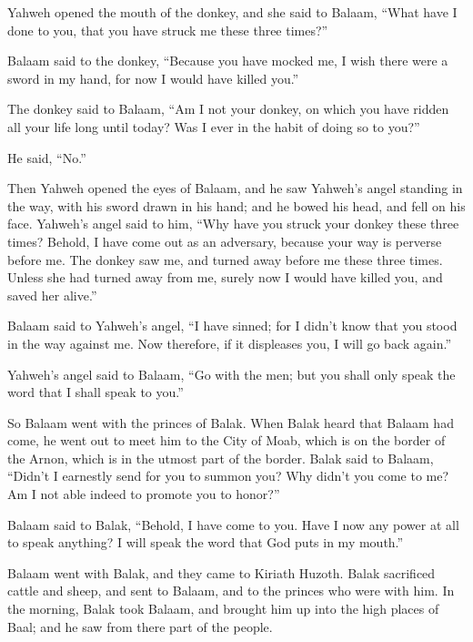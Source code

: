  Yahweh opened the mouth of the donkey, and she said to
Balaam, ``What have I done to you, that you have struck me these three
times?''

 Balaam said to the donkey, ``Because you have mocked me,
I wish there were a sword in my hand, for now I would have killed you.''

 The donkey said to Balaam, ``Am I not your donkey, on
which you have ridden all your life long until today? Was I ever in the
habit of doing so to you?''

He said, ``No.''

 Then Yahweh opened the eyes of Balaam, and he saw
Yahweh's angel standing in the way, with his sword drawn in his hand;
and he bowed his head, and fell on his face.  Yahweh's
angel said to him, ``Why have you struck your donkey these three times?
Behold, I have come out as an adversary, because your way is perverse
before me.  The donkey saw me, and turned away before me
these three times. Unless she had turned away from me, surely now I
would have killed you, and saved her alive.''

 Balaam said to Yahweh's angel, ``I have sinned; for I
didn't know that you stood in the way against me. Now therefore, if it
displeases you, I will go back again.''

 Yahweh's angel said to Balaam, ``Go with the men; but
you shall only speak the word that I shall speak to you.''

So Balaam went with the princes of Balak.  When Balak
heard that Balaam had come, he went out to meet him to the City of Moab,
which is on the border of the Arnon, which is in the utmost part of the
border.  Balak said to Balaam, ``Didn't I earnestly send
for you to summon you? Why didn't you come to me? Am I not able indeed
to promote you to honor?''

 Balaam said to Balak, ``Behold, I have come to you. Have
I now any power at all to speak anything? I will speak the word that God
puts in my mouth.''

 Balaam went with Balak, and they came to Kiriath Huzoth.
 Balak sacrificed cattle and sheep, and sent to Balaam,
and to the princes who were with him.  In the morning,
Balak took Balaam, and brought him up into the high places of Baal; and
he saw from there part of the people.

